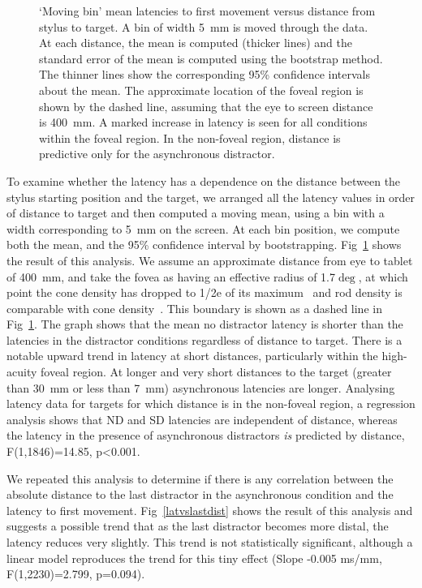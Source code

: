 \documentclass[10pt,letterpaper]{article}
\begin{document}
\begin{figure}[htb!]
\centering
\caption[Mean latencies vs. distance] {`Moving bin' mean latencies to
  first movement versus distance from stylus to target. A bin of width
  5~mm is moved through the data. At each distance, the mean is
  computed (thicker lines) and the standard error of the mean is
  computed using the bootstrap method. The thinner lines show the
  corresponding 95\% confidence intervals about the mean. The
  approximate location of the foveal region is shown by the dashed
  line, assuming that the eye to screen distance is 400~mm. A marked
  increase in latency is seen for all conditions within the foveal
  region. In the non-foveal region, distance is predictive only for
  the asynchronous distractor.}
\label{latvsdist}
\end{figure}

To examine whether the latency has a dependence on the distance
between the stylus starting position and the target, we arranged all
the latency values in order of distance to target and then computed a
moving mean, using a bin with a width corresponding to 5~mm on the
screen. At each bin position, we compute both the mean, and the 95\%
confidence interval by bootstrapping. Fig~\ref{latvsdist} shows the
result of this analysis. We assume an approximate distance from eye to
tablet of 400~mm, and take the fovea as having an effective radius of
1.7$\deg$, at which point the cone density has dropped to 1/2e of its
maximum~\cite{hirsch_spatial_1989} and rod density is comparable with
cone density~\cite{jonas_count_1992}. This boundary is shown as a
dashed line in Fig~\ref{latvsdist}. The graph shows that the mean no
distractor latency is shorter than the latencies in the distractor
conditions regardless of distance to target. There is a notable upward
trend in latency at short distances, particularly within the
high-acuity foveal region. At longer and very short distances to the
target (greater than 30~mm or less than 7~mm) asynchronous latencies
are longer. Analysing latency data for targets for which distance is
in the non-foveal region, a regression analysis shows that ND and SD
latencies are independent of distance, whereas the latency in the
presence of asynchronous distractors \emph{is} predicted by distance,
F(1,1846)=14.85, p\textless0.001.

We repeated this analysis to determine if there is any correlation
between the absolute distance to the last distractor in the
asynchronous condition and the latency to first
movement. Fig~\ref{latvslastdist} shows the result of this analysis
and suggests a possible trend that as the last distractor becomes more
distal, the latency reduces very slightly. This trend is not
statistically significant, although a linear model reproduces the
trend for this tiny effect (Slope -0.005 ms/mm, F(1,2230)=2.799,
p=0.094).
\end{document}
